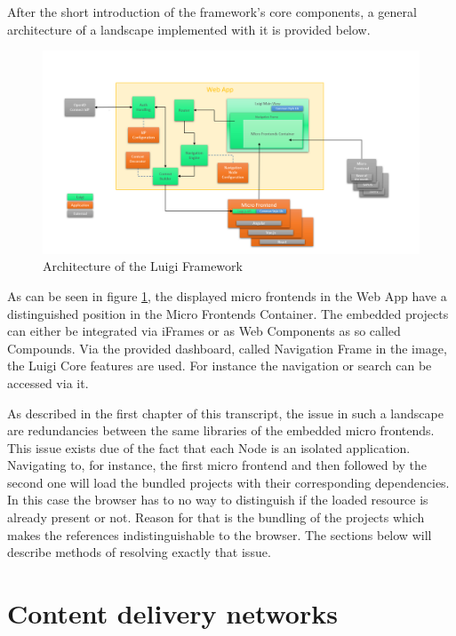 After the short introduction of the framework's core components, a general architecture of a landscape implemented with it is provided below.

\begin{figure}[!h]
	\centering
	\includegraphics[width=1\textwidth]{Figures/Luigi_Architektur.png}
	\caption{Architecture of the Luigi Framework \cite{luigi_architecture}}
	\label{fig:luigi_architecture_fig}
\end{figure}

As can be seen in figure \ref{fig:luigi_architecture_fig}, the displayed micro frontends in the Web App have a distinguished position in the Micro Frontends Container. The embedded projects can either be integrated via iFrames or as Web Components as so called Compounds.
Via the provided dashboard, called Navigation Frame in the image, the Luigi Core features are used. For instance the navigation or search can be accessed via it.

As described in the first chapter of this transcript, the issue in such a landscape are redundancies between the same libraries of the embedded micro frontends. This issue exists due of the fact that each Node is an isolated application.
Navigating to, for instance, the first micro frontend and then followed by the second one will load the bundled projects with their corresponding dependencies. In this case the browser has to no way to distinguish if the loaded resource is already present or not. Reason for that is the bundling of the projects which makes the references indistinguishable to the browser.
The sections below will describe methods of resolving exactly that issue. 

\section{Content delivery networks}
\label{cdn_intro}

